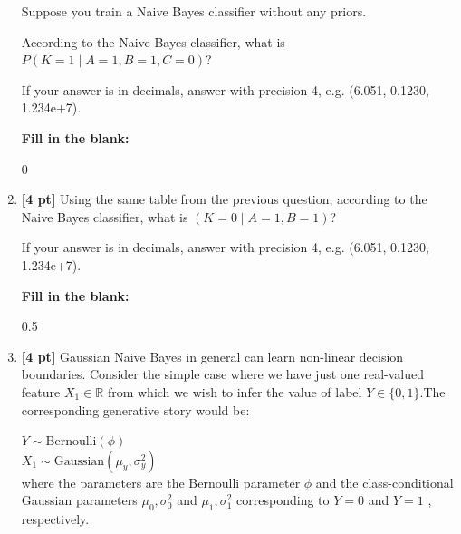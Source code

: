 \documentclass[12pt]{article}
\begin{document}
\begin{enumerate}
    Suppose you train a Naive Bayes classifier without any priors. 
    
    According to the Naive Bayes classifier, what is $P(K=1 \mid A=1,B=1,C=0)$?  %
    
    If your answer is in decimals, answer with precision 4, e.g. (6.051, 0.1230, 1.234e+7).

    \textbf{Fill in the blank:}
    
    \begin{tcolorbox}[fit,height=1cm, width=4cm, blank, borderline={1pt}{-2pt},nobeforeafter]
    
    \begin{center}\huge0\end{center}
    \end{tcolorbox}
    
    
    \item \textbf{[4 pt]} Using the same table from the previous question, according to the Naive Bayes classifier, what is $(K = 0\mid A = 1, B = 1)$? %
    
    If your answer is in decimals, answer with precision 4, e.g. (6.051, 0.1230, 1.234e+7).

    \textbf{Fill in the blank:}
    
    \begin{tcolorbox}[fit,height=1cm, width=4cm, blank, borderline={1pt}{-2pt},nobeforeafter]
    
    \begin{center}\huge0.5\end{center}
    \end{tcolorbox}
    
    
    
    \clearpage
    
    \item \textbf{[4 pt]} Gaussian Naive Bayes in general can learn non-linear decision boundaries. Consider the simple case where we have just one real-valued feature $X_1\in\mathbb{R}$ from which we wish to infer the value of label $Y\in\{0,1\}$.The corresponding generative story would be:
    
    $Y \sim \text{Bernoulli}(\phi)$\\
    $X_1 \sim \text{Gaussian}(\mu_y, \sigma^2_y)$\\
    where the parameters are the Bernoulli parameter $\phi$  and the class-conditional Gaussian parameters $\mu_0, \sigma^2_0$ and $\mu_1, \sigma^2_1$   corresponding to $Y=0$ and $Y=1$ , respectively.


\end{enumerate}
\end{document}

